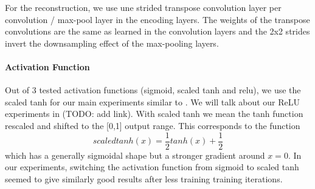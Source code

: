 \documentclass{article}
\begin{document}


    For the reconstruction, we use une strided transpose convolution layer per convolution / max-pool layer in the encoding layers. The weights of the transpose convolutions are the same as learned in the convolution layers and the 2x2 strides invert the downsampling effect of the max-pooling layers.

    \paragraph{Activation Function}
    \label{par:activation_function}
    Out of 3 tested activation functions (sigmoid, scaled tanh and relu), we use the scaled tanh for our main experiments similar to \citep{masci11}. We will talk about our ReLU experiments in (TODO: add link). With scaled tanh we mean the tanh function rescaled and shifted to the [0,1] output range. This corresponds to the function $$scaledtanh(x) = \frac{1}{2}tanh(x) + \frac{1}{2}$$ which has a generally sigmoidal shape but a stronger gradient around $x = 0$. In our experiments, switching the activation function from sigmoid to scaled tanh seemed to give similarly good results after less training training iterations. 
\end{document}
